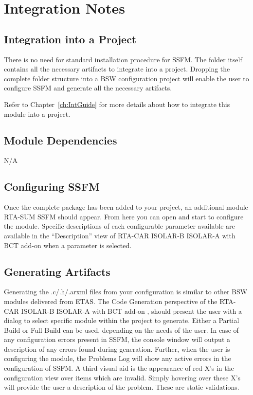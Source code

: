 \chapter{Integration Notes}

\section{Integration into a Project}
\ifnum {}
\else
{
There is no need for standard installation procedure for SSFM. The folder itself contains all the necessary
artifacts to integrate into a project. Dropping the complete folder structure into a BSW configuration
project will enable the user to configure SSFM and generate all the necessary artifacts.
}
\fi

Refer to Chapter~\ref {ch:IntGuide}
for more details about how to integrate this module into a project.

\section{Module Dependencies}
\label{sec:dependencies}
N/A

\section{Configuring SSFM}
Once the complete package has been added to your project, an additional module RTA-SUM SSFM should appear.
From here you can open and start to configure the module.
Specific descriptions of each configurable parameter available are available in the “Description” view of 
\ifnum {}
{
RTA-CAR ISOLAR-B
}
\else
{
ISOLAR-A with BCT add-on 
}\fi when a parameter is selected.

\section{Generating Artifacts}
Generating the .c/.h/.arxml files from your configuration is similar to other BSW modules delivered from ETAS.
The Code Generation perspective of the 
\ifnum {}
{
RTA-CAR ISOLAR-B
}
\else
{
ISOLAR-A with BCT add-on 
}\fi , should present the user with a dialog to select specific module within the project to generate.
\ifnum {}
{
}
\else
{
Either a Partial Build or Full Build can be used, depending on the needs of the user.
}\fi
In case of any configuration errors present in SSFM, the console window will output a description of any errors found during generation.
Further, when the user is configuring the module, the Problems Log will show any active errors in the configuration of SSFM.
A third visual aid is the appearance of red X’s in the configuration view over items which are invalid.
Simply hovering over these X’s will provide the user a description of the problem.
These are static validations.

